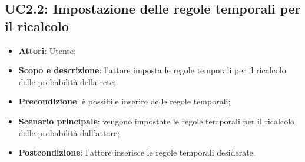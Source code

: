\subsection{UC2.2: Impostazione delle regole temporali per il ricalcolo}
\hypertarget{UC2.2}{}
\begin{itemize}
	\item \textbf{Attori}: Utente;
	\item \textbf{Scopo e descrizione}: l'attore imposta le regole temporali per il ricalcolo delle probabilità della rete;
	\item \textbf{Precondizione}: è possibile inserire delle regole temporali;
	\item \textbf{Scenario principale}: vengono impostate le regole temporali per il ricalcolo delle probabilità dall'attore;
	\item \textbf{Postcondizione}: l'attore inserisce le regole temporali desiderate.
\end{itemize}

